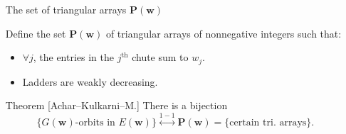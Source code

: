 \documentclass[final]{beamer}
\newlength{\onecolwid}
\newlength{\twocolwid}
\newcommand{\bw}{\mathbf{w}}
\newcommand{\bP}{\mathbf{P}}
\begin{document}
\begin{frame}[t]
\begin{columns}[t]
\begin{column}{\onecolwid}
\end{column} %

\begin{column}{\twocolwid} %

\begin{block}{The set of triangular arrays $\bP(\bw)$}
\begin{center}
\begin{minipage}[t]{0.3\textwidth}
\kern0pt
\center
\vspace{-10mm}
\end{minipage}%
\begin{minipage}[t]{0.7\textwidth}
\kern0pt
\raggedright
\vspace{-.5cm}
Define the set $\bP(\bw)$ of triangular arrays of nonnegative integers such that:
\begin{itemize}
\item $\forall j$, the entries in the $j^{\mathrm{th}}$ chute sum to $w_j$.
\item Ladders are weakly decreasing.
\end{itemize}
\end{minipage}%
\end{center}
\end{block}

\vspace{-6mm}
\begin{alertblock}{Theorem [Achar--Kulkarni--M.]}
There is a bijection
\[
\{G(\bw)\text{-orbits in } E(\bw)\} \stackrel{1-1}{\longleftrightarrow} \bP(\bw) = \{\text{certain tri. arrays}\}.
\]
\end{alertblock}


\end{column}
\end{columns}
\end{frame}
\end{document}
